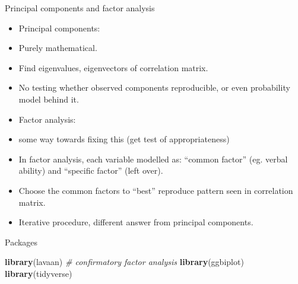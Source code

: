 \documentclass[ignorenonframetext,]{beamer}
\newenvironment{Shaded}{\begin{snugshade}}{\end{snugshade}}
\newcommand{\CommentTok}[1]{\textcolor[rgb]{0.56,0.35,0.01}{\textit{#1}}}
\newcommand{\KeywordTok}[1]{\textcolor[rgb]{0.13,0.29,0.53}{\textbf{#1}}}
\newcommand{\NormalTok}[1]{#1}
\begin{document}
\begin{frame}{Principal components and factor analysis}
\protect\hypertarget{principal-components-and-factor-analysis}{}

\begin{itemize}
\item
  Principal components:
\item
  Purely mathematical.
\item
  Find eigenvalues, eigenvectors of correlation matrix.
\item
  No testing whether observed components reproducible, or even
  probability model behind it.
\item
  Factor analysis:
\item
  some way towards fixing this (get test of appropriateness)
\item
  In factor analysis, each variable modelled as: ``common factor'' (eg.
  verbal ability) and ``specific factor'' (left over).
\item
  Choose the common factors to ``best'' reproduce pattern seen in
  correlation matrix.
\item
  Iterative procedure, different answer from principal components.
\end{itemize}

\end{frame}

\begin{frame}[fragile]{Packages}
\protect\hypertarget{packages-10}{}

\begin{Shaded}
\begin{Highlighting}[]
\KeywordTok{library}\NormalTok{(lavaan) }\CommentTok{# confirmatory factor analysis}
\KeywordTok{library}\NormalTok{(ggbiplot)}
\KeywordTok{library}\NormalTok{(tidyverse)}
\end{Highlighting}
\end{Shaded}

\end{frame}
\end{document}
